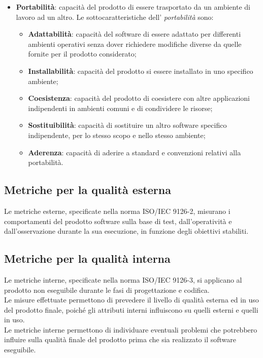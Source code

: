 \begin{itemize}
\begin{itemize}
	\end{itemize}
\item \textbf{Portabilità}: capacità del prodotto di essere trasportato da un ambiente di lavoro ad un altro. Le sottocaratteristiche dell' \textit{portabilità} sono:
	\begin{itemize}
	\item \textbf{Adattabilità}: capacità del software di essere adattato per differenti ambienti operativi senza dover richiedere modifiche diverse da quelle fornite per il prodotto considerato;
	\item \textbf{Installabilità}: capacità del prodotto si essere installato in uno specifico ambiente;
	\item \textbf{Coesistenza}: capacità del prodotto di coesistere con altre applicazioni indipendenti in ambienti comuni e di condividere le risorse;
	\item \textbf{Sostituibilità}: capacità di sostituire un altro software specifico indipendente, per lo stesso scopo e nello stesso ambiente;
	\item \textbf{Aderenza}: capacità di aderire a standard e convenzioni relativi alla portabilità.
	\end{itemize}
\end{itemize}

\subsection{Metriche per la qualità esterna}
Le metriche esterne, specificate nella norma ISO/IEC 9126-2, misurano i comportamenti del prodotto software sulla base di test, dall'operatività e dall'osservazione durante la sua esecuzione, in funzione degli obiettivi stabiliti.

\subsection{Metriche per la qualità interna}
Le metriche interne, specificate nella norma ISO/IEC 9126-3, si applicano al prodotto non eseguibile durante le fasi di progettazione e codifica. \\
Le misure effettuate permettono di prevedere il livello di qualità esterna ed in uso del prodotto finale, poiché gli attributi interni influiscono su quelli esterni e quelli in uso. \\
Le metriche interne permettono di individuare eventuali problemi che potrebbero influire sulla qualità finale del prodotto prima che sia realizzato il software eseguibile.

